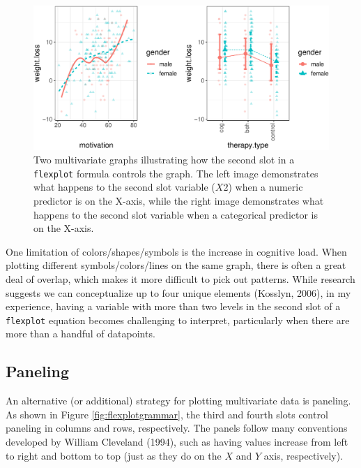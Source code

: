 \documentclass[
  english,
  man]{apa6}
\begin{document}
\begin{figure}
\centering
\includegraphics{flexplot_psychmeth_files/figure-latex/symbols-1.pdf}
\caption{\label{fig:symbols}Two multivariate graphs illustrating how the second slot in a \texttt{flexplot} formula controls the graph. The left image demonstrates what happens to the second slot variable (\(X2\)) when a numeric predictor is on the X-axis, while the right image demonstrates what happens to the second slot variable when a categorical predictor is on the X-axis.}
\end{figure}

\normalsize

One limitation of colors/shapes/symbols is the increase in cognitive load. When plotting different symbols/colors/lines on the same graph, there is often a great deal of overlap, which makes it more difficult to pick out patterns. While research suggests we can conceptualize up to four unique elements (Kosslyn, 2006), in my experience, having a variable with more than two levels in the second slot of a \texttt{flexplot} equation becomes challenging to interpret, particularly when there are more than a handful of datapoints.

\hypertarget{paneling}{%
\subsection{Paneling}\label{paneling}}

An alternative (or additional) strategy for plotting multivariate data is paneling. As shown in Figure \ref{fig:flexplotgrammar}, the third and fourth slots control paneling in columns and rows, respectively. The panels follow many conventions developed by William Cleveland (1994), such as having values increase from left to right and bottom to top (just as they do on the \(X\) and \(Y\) axis, respectively).
\end{document}
